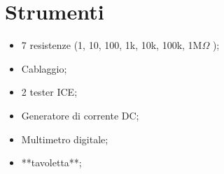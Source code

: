 \section{Strumenti}
\begin{itemize} [noitemsep]
	\item 7 resistenze (1, 10, 100, 1k, 10k, 100k, 1M$\Omega$ ); 
	\item Cablaggio;
	\item 2 tester ICE;
	\item Generatore di corrente DC;
	\item Multimetro digitale;
	\item **tavoletta**;
\end{itemize}